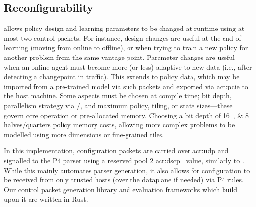
\subsection{Reconfigurability}\label{sec:reconfigurability}
\approachshort{} allows policy design and learning parameters to be changed at runtime using at most two control packets.
For instance, design changes are useful at the end of learning (moving from online to offline), or when trying to train a new policy for another problem from the same vantage point.
Parameter changes are useful when an online agent must become more (or less) adaptive to new data (i.e., after detecting a changepoint in traffic).
This extends to policy data, which may be imported from a pre-trained model via such packets and exported via \gls{acr:pcie} to the host machine.
Some aspects must be chosen at compile time; bit depth, parallelism strategy via \Coopfw/\Indfw, and maximum policy, tiling, or state sizes---these govern core operation or pre-allocated memory.
Choosing a bit depth of \qtylist[list-pair-separator = { or }]{16;8}{\bit} halves/quarters policy memory costs, allowing more complex problems to be modelled using more dimensions or fine-grained tiles.

In this implementation, configuration packets are carried over \gls{acr:udp} and signalled to the P4 parser using a reserved pool 2 \gls{acr:dscp}~\parencite{rfc2474} value, similarly to \textcite{DBLP:conf/isca/LiLYCSH19}.
While this mainly automates parser generation, it also allows for configuration to be received from only trusted hosts (over the dataplane if needed) via P4 rules.
Our control packet generation library and evaluation frameworks which build upon it are written in Rust.



